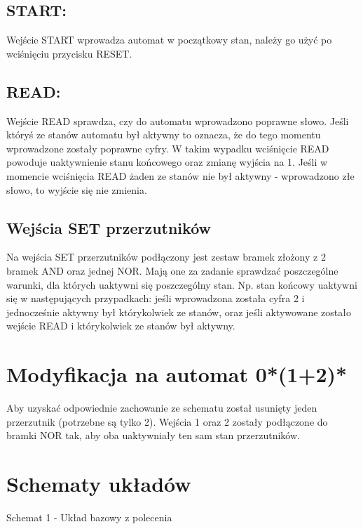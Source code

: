 \documentclass[12pt,a4paper]{article}
\begin{document}
		\subsection{START:}
			Wejście START wprowadza automat w początkowy stan, należy go użyć po wciśnięciu przycisku RESET. 

		\subsection{READ:}
			Wejście READ sprawdza, czy do automatu wprowadzono poprawne słowo.
			Jeśli któryś ze stanów automatu był aktywny to oznacza, że do tego momentu wprowadzone zostały poprawne cyfry.
			W takim wypadku wciśnięcie READ powoduje uaktywnienie stanu końcowego oraz zmianę wyjścia na 1.
			Jeśli w momencie wciśnięcia READ żaden ze stanów nie był aktywny - wprowadzono złe słowo, to wyjście się nie zmienia.

		\subsection{Wejścia SET przerzutników}
			Na wejścia SET przerzutników podłączony jest zestaw bramek złożony z 2 bramek AND oraz jednej NOR.
			Mają one za zadanie sprawdzać poszczególne warunki, dla których uaktywni się poszczególny stan.
			Np. stan końcowy uaktywni się w następujących przypadkach: jeśli wprowadzona została cyfra 2 i jednocześnie aktywny był którykolwiek ze stanów,
			oraz jeśli aktywowane zostało wejście READ i którykolwiek ze stanów był aktywny.

	\section{Modyfikacja na automat 0*(1+2)*}
		Aby uzyskać odpowiednie zachowanie ze schematu został usunięty jeden przerzutnik (potrzebne są tylko 2).
		Wejścia 1 oraz 2 zostały podłączone do bramki NOR tak, aby oba uaktywniały ten sam stan przerzutników.
		
		
	\section{Schematy układów}
	
	\begin{center}
		Schemat 1 - Układ bazowy z polecenia
	\end{center}
	
\end{document}
